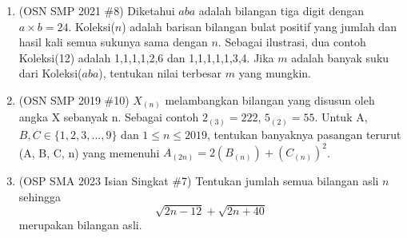\documentclass[11pt,letterpaper]{article}
\begin{document}
\begin{enumerate}[resume]
    \item (OSN SMP 2021 \#8) Diketahui $aba$ adalah bilangan tiga digit dengan $a \times b = 24$. Koleksi($n$) adalah barisan bilangan bulat positif yang jumlah dan hasil kali semua sukunya sama dengan $n$. Sebagai ilustrasi, dua contoh Koleksi(12) adalah 1,1,1,1,2,6 dan 1,1,1,1,1,3,4. Jika $m$ adalah banyak suku dari Koleksi($aba$), tentukan nilai terbesar $m$ yang mungkin.

    \item (OSN SMP 2019 \#10) $X_{(n)}$ melambangkan bilangan yang disusun oleh angka X sebanyak n. Sebagai contoh $2_{(3)}=222$, $5_{(2)}=55.$ Untuk A, $B,C\in\{1,2,3,...,9\}$ dan $1\le n\le2019$, tentukan banyaknya pasangan terurut (A, B, C, n) yang memenuhi $A_{(2n)}=2(B_{(n)})+(C_{(n)})^{2}$.

    \item (OSP SMA 2023 Isian Singkat \#7) Tentukan jumlah semua bilangan asli $n$ sehingga
    \[ \sqrt{2n-12}+\sqrt{2n+40} \]
    merupakan bilangan asli.


\end{enumerate}
\end{document}
